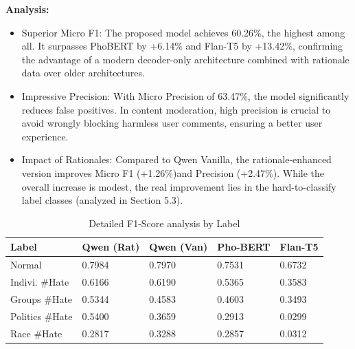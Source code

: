 \documentclass[11pt]{article}
\begin{document}
\textbf{Analysis:}
\begin{itemize}[leftmargin=*]
\item Superior Micro F1: The proposed model achieves 60.26\%, the highest among all. It
surpasses PhoBERT by +6.14\% and Flan-T5 by +13.42\%, confirming the advantage of a
modern decoder-only architecture combined with rationale data over older
architectures.
\item Impressive Precision: With Micro Precision of 63.47\%, the model significantly
reduces false positives. In content moderation, high precision is crucial to avoid wrongly
blocking harmless user comments, ensuring a better user experience.
\item Impact of Rationales: Compared to Qwen Vanilla, the rationale-enhanced version
improves Micro F1 (+1.26\%)and Precision (+2.47\%). While the overall increase is
modest, the real improvement lies in the hard-to-classify label classes (analyzed in
Section 5.3).
\end{itemize}

\begin{table}[ht]
\centering
\caption{Detailed F1-Score analysis by Label}
\label{tab:label_f1}
\setlength{\tabcolsep}{2pt}
\scriptsize
\begin{tabularx}{\columnwidth}{>{\raggedright\arraybackslash}p{1.8cm}XXXX} %
\toprule
\textbf{Label} & \textbf{Qwen (Rat)} & \textbf{Qwen (Van)} & \textbf{Pho-BERT} & \textbf{Flan-T5} \\
\midrule
Normal & 0.7984 & 0.7970 & 0.7531 & 0.6732 \\
Indivi. \#Hate & 0.6166 & 0.6190 & 0.5365 & 0.3583 \\
Groups \#Hate & 0.5344 & 0.4583 & 0.4603 & 0.3493 \\
Politics \#Hate & 0.5400 & 0.3659 & 0.2913 & 0.0299 \\
Race \#Hate & 0.2817 & 0.3288 & 0.2857 & 0.0312 \\
\bottomrule
\end{tabularx}
\end{table}
\end{document}
